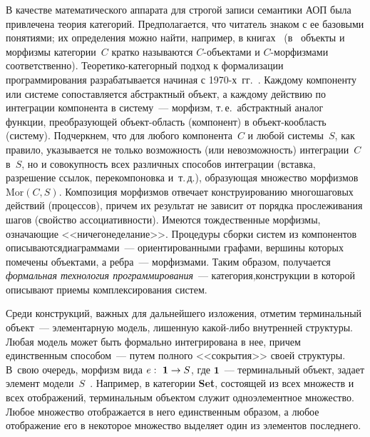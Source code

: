 \begin{multicols}{2}
   В качестве математического аппарата для строгой записи семантики АОП 
была привлечена теория категорий. Предполагается, что читатель знаком с ее 
базовыми понятиями; их определения можно найти, например, в 
книгах~\cite{12-kov, 11-kov} (в~\cite{11-kov} объекты и морфизмы 
категории~$C$ кратко называются $C$-объ\-ек\-та\-ми и $C$-мор\-физ\-ма\-ми 
соответственно). Тео\-ре\-ти\-ко-ка\-те\-гор\-ный подход к формализации 
программирования разрабатывается начиная с 1970-х~гг.~\cite{4-kov}. 
Каждому компоненту или системе со\-по\-став\-ля\-ет\-ся абстрактный объект, а 
каждому действию по интеграции компонента в сис\-те\-му~--- морфизм, т.\,е.\ 
абстрактный аналог функции, преобразующей\linebreak
 объ\-ект-об\-ласть (компонент) в 
объ\-ект-ко\-об\-ласть (сис\-те\-му). Подчеркнем, что для любого 
компонента~$C$ и любой системы~$S$, как правило, указывается не только 
возможность (или невозможность) интеграции~$C$ в~$S$, но и совокупность 
всех различных способов интеграции (вставка, разрешение ссылок, 
перекомпоновка и~т.\,д.), образу\-ющая множество морфизмов 
$\mathrm{Mor}(C, S)$. Композиция морфизмов отвечает конструированию 
многошаговых действий (процессов), причем их результат не зависит от 
порядка прослеживания шагов (свойство ассоциативности). Имеются 
тождественные морфизмы, означающие <<ничегонеделание>>. Процеду\-ры 
сборки систем из компонентов описываются\linebreak диаграммами~--- 
ориентированными графами, вершины которых помечены объектами, а 
   ребра~--- морфизмами. Таким образом, получается \textit{формальная 
технология программирования}~--- категория,\linebreak конструкции в которой 
описывают приемы комплексирования сис\-тем.
   
   Среди конструкций, важных для дальнейшего изложения, отметим 
терминальный объект~--- элементарную модель, лишенную ка\-кой-ли\-бо 
внут\-рен\-ней структуры. Любая модель может быть формально интегрирована в 
нее, причем единственным способом~--- путем полного <<сокрытия>> своей 
структуры. В~свою очередь, морфизм вида $e:\ \mathbf{1}\hm\rightarrow S$, где 
$\mathbf{1}$~--- терминальный объект, задает элемент 
   модели~$S$~\cite{12-kov}. Например, в категории \textbf{Set}, состоящей из 
всех множеств и всех отображений, терминальным объектом служит 
одноэлементное множество. Любое множество отображается в него 
единственным образом, а любое отображение его в некоторое множество 
выделяет один из элементов последнего.
   

\end{multicols}
